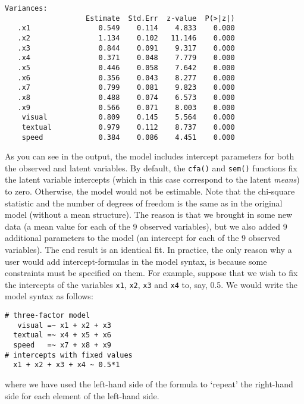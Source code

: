 \begin{verbatim}
Variances:
                   Estimate  Std.Err  z-value  P(>|z|)
   .x1                0.549    0.114    4.833    0.000
   .x2                1.134    0.102   11.146    0.000
   .x3                0.844    0.091    9.317    0.000
   .x4                0.371    0.048    7.779    0.000
   .x5                0.446    0.058    7.642    0.000
   .x6                0.356    0.043    8.277    0.000
   .x7                0.799    0.081    9.823    0.000
   .x8                0.488    0.074    6.573    0.000
   .x9                0.566    0.071    8.003    0.000
    visual            0.809    0.145    5.564    0.000
    textual           0.979    0.112    8.737    0.000
    speed             0.384    0.086    4.451    0.000
\end{verbatim}

As you can see in the output, the model includes intercept parameters
for both the observed and latent variables. By default, the
\texttt{cfa()} and \texttt{sem()} functions fix the latent variable
intercepts (which in this case correspond to the latent \emph{means}) to
zero. Otherwise, the model would not be estimable. Note that the
chi-square statistic and the number of degrees of freedom is the same as
in the original model (without a mean structure). The reason is that we
brought in some new data (a mean value for each of the 9 observed
variables), but we also added 9 additional parameters to the model (an
intercept for each of the 9 observed variables). The end result is an
identical fit. In practice, the only reason why a user would add
intercept-formulas in the model syntax, is because some constraints must
be specified on them. For example, suppose that we wish to fix the
intercepts of the variables \texttt{x1}, \texttt{x2}, \texttt{x3} and
\texttt{x4} to, say, 0.5. We would write the model syntax as follows:

\begin{verbatim}
# three-factor model
   visual =~ x1 + x2 + x3
  textual =~ x4 + x5 + x6
  speed   =~ x7 + x8 + x9
# intercepts with fixed values
  x1 + x2 + x3 + x4 ~ 0.5*1
\end{verbatim}

where we have used the left-hand side of the formula to `repeat' the
right-hand side for each element of the left-hand side.
